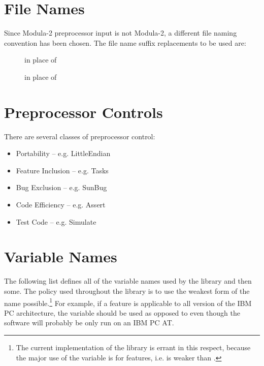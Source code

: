 \section{File Names}
Since Modula-2 preprocessor input is not Modula-2, a different file naming
convention has 
been chosen.  The file name suffix replacements
to be used are:
\begin{description}

\item[]
    in place of 

\item[]
    in place of 

\end{description}

\section{Preprocessor Controls}
There are several classes of preprocessor control:

\begin{itemize}
	\item
	Portability -- e.g. LittleEndian
	\item
	Feature Inclusion -- e.g. Tasks
	\item
	Bug Exclusion -- e.g. SunBug
	\item
	Code Efficiency -- e.g. Assert
	\item
	Test Code -- e.g. Simulate
\end{itemize}

\section{Variable Names}
    
The following list defines all of the 
variable names used by
the library and then some.  The policy used throughout the library
is to use the weakest form of the name possible.\footnote{
    The current implementation of the library is errant in this
    respect, because the major use of the  
    variable is for  features, i.e. 
    is weaker than .
    }
For example, if a feature is applicable to all version of the
IBM PC architecture, the variable  should
be used as opposed to  even though the 
software will probably be only run on an IBM PC AT.  

